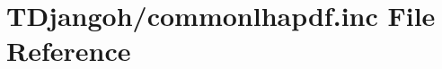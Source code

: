 \hypertarget{commonlhapdf_8inc}{\section{T\+Djangoh/commonlhapdf.inc File Reference}
\label{commonlhapdf_8inc}
}
